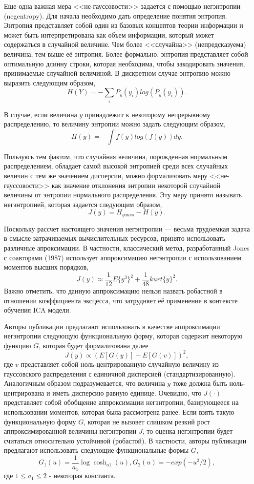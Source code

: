 \documentclass[runningheads]{llncs}
\begin{document}
Еще одна важная мера <<не-гауссовости>> задается с помощью негэнтропии (negentropy). Для начала необходимо дать определение понятия энтропия. Энтропия представляет собой один из базовых концептов теории информации и может быть интерпретирована как объем информации, который может содержаться в случайной величине. Чем более <<случайна>> (непредсказуема) величина, тем выше её энтропия. Более формально, энтропия представляет собой оптимальную длинну строки, которая необходима, чтобы закодировать значения, принимаемые случайной величиной. В дискретном случае энтропию можно выразить следующим образом, $$H(Y) = -\sum_i P_y(y_i) log(P_y(y_i)).$$\par
В случае, если величина $y$ принадлежит к некоторому непрерывному распределению, то величину энтропии можно задать следующим образом, $$H(y) = -\int f(y)log(f(y))dy.$$ \par
Пользуясь тем фактом, что случайная величина, порожденная нормальным распределением, обладает самой высокой энтропией среди всех случайных величин с тем же значением дисперсии, можно формализовать меру <<не-гауссовости>> как значение отклонения энтропии некоторой случайной величины от энтропии нормального распределения. Эту меру принято называть негэнтропией, которая задается следующим образом, $$J(y) = H_{gauss} - H(y).$$ \par
Поскольку рассчет настоящего значения негэнтропии — весьма трудоемкая задача в смысле затрачиваемых вычислительных ресурсов, принято использовать различные апроксимации. В частности, классический метод, разработанный Jones с соавторами (1987) использует аппроксимацию негэнтропии с использованием моментов высших порядков, $$J(y) \approx \frac{1}{12}E\{y^3\}^2 + \frac{1}{48}kurt\{y\}^2.$$ Важно отметить, что данную аппроксимацию нельзя назвать робастной в отношении коэффициента эксцесса, что затрудняет её применение в контексте обучения ICA модели. \par
Авторы публикации \cite{fastica} предлагают использовать в качестве аппроксимации негэнтропии следующую функциональную форму, которая содержит некоторую функцию $G$, которая будет формализована далее
$$J(y) \propto (E[G(y)] - E[G(v)])^2,$$
где $v$ представляет собой ноль-центрированную случайную величину из гауссовского распределения с единичной дисперсией (стандартизированную). Аналогичным образом подразумевается, что величина $y$ тоже должна быть ноль-центрирована и иметь дисперсию равную единице. Очевидно, что $J(\cdot)$ представляет собой обобщение аппроксимации негэнтропии, базирующееся на использовании моментов, которая была рассмотрена ранее. Если взять такую функциональную форму $G$, которая не вызовет слишком резкий рост аппроксимированной величины негэнтропии $J$, то оценка негэнтропии будет считаться относительно устойчивой (робастой). В частности, авторы публикации предлагают использовать следующие функциональные формы $G,$
$$G_1(u) = \frac{1}{a_1}\log \cosh _{a1}(u), G_2(u) = -exp(-u^2 / 2),$$
где $1 \leq a_1 \leq 2$ - некоторая константа.\par
\end{document}
